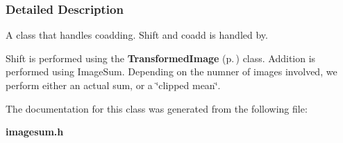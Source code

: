 \subsubsection{Detailed Description}
A class that handles coadding. Shift and coadd is handled by.

Shift is performed using the {\bf Transformed\-Image} {\rm (p.\,\pageref{class_transformedimage})} class. Addition is performed using Image\-Sum. Depending on the numner of images involved, we perform either an actual sum, or a \char`\"{}clipped mean\char`\"{}. 



The documentation for this class was generated from the following file:\begin{CompactItemize}
\item 
{\bf imagesum.h}\end{CompactItemize}
